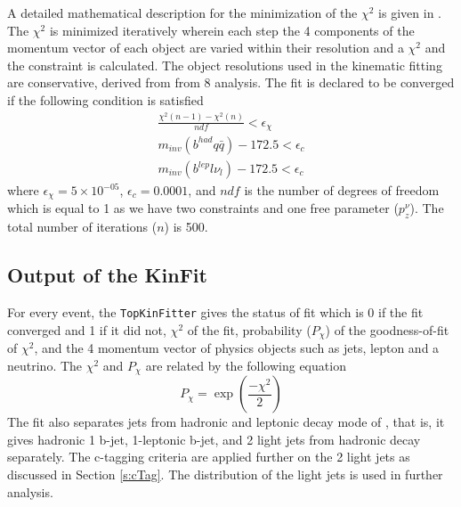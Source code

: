 A detailed mathematical description for the minimization of the $\chi^2$ is
given in \cite{DHondt:2006iej}. The $\chi^2$ is minimized iteratively wherein each step 
the 4 components of the momentum vector of each object are varied
within their resolution and a $\chi^2$ and the constraint is calculated. 
The object resolutions used in the kinematic fitting are conservative, 
derived from from 8 \TeV analysis. The fit is declared to be converged 
if the following condition is satisfied
\begin{subequations}
\begin{eqnarray}
	\frac{\chi^2 (n-1) - \chi^2 (n)}{ndf} < \epsilon_{\chi}\\ 
	m_{inv}(b^{had}q\bar{q}) - 172.5 < \epsilon_{c}\\
        m_{inv}(b^{lep}l\nu_l) - 172.5 < \epsilon_{c}
\end{eqnarray}
\end{subequations}
where $\epsilon_{\chi} = 5\times 10^{-05}$, $\epsilon_{c} = 0.0001$, and $ndf$
is the number of degrees of freedom which is equal to 1 as we have two 
constraints and one free parameter ($p_z^\nu$). The total number of iterations ($n$)
is 500.

\subsection{Output of the KinFit}
\label{ss:outputKF} 
For every event, the \verb|TopKinFitter| gives the status of fit which is 0 if 
the fit converged and 1 if it did not, $\chi^2$ of the fit, probability ($P_{\chi}$) 
of the goodness-of-fit of $\chi^2$, and the 4 momentum vector of physics objects such
as jets, lepton and a neutrino. The $\chi^2$ and $P_{\chi}$ are related by the 
following equation
\begin{equation}
	P_{\chi} = \exp(\frac{-\chi^2}{2})
\end{equation}
The fit also separates jets from hadronic and leptonic decay mode of \ttbar, 
that is, it gives hadronic 1 b-jet, 1-leptonic b-jet, and 2 light jets from hadronic
decay separately. The c-tagging criteria are applied further on the 2 light jets as 
discussed in Section \ref{s:cTag}. The \mjj distribution of the light jets is used in 
further analysis.

